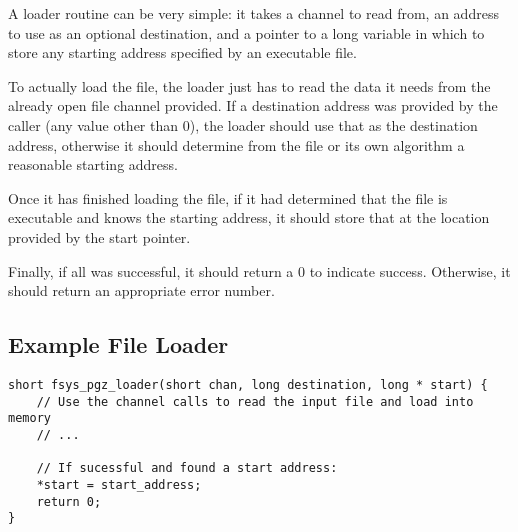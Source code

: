 A loader routine can be very simple: it takes a channel to read from, an address to use as an optional destination,
and a pointer to a long variable in which to store any starting address specified by an executable file.

To actually load the file, the loader just has to read the data it needs from the already open file channel provided.
If a destination address was provided by the caller (any value other than 0), the loader should use that as the destination address,
otherwise it should determine from the file or its own algorithm a reasonable starting address.

Once it has finished loading the file, if it had determined that the file is executable and knows the starting address,
it should store that at the location provided by the start pointer.

Finally, if all was successful, it should return a 0 to indicate success. Otherwise, it should return an appropriate error number.

\subsection*{Example File Loader}
\begin{lstlisting}
short fsys_pgz_loader(short chan, long destination, long * start) {
    // Use the channel calls to read the input file and load into memory
    // ...

    // If sucessful and found a start address:
    *start = start_address;
    return 0;
}
\end{lstlisting}